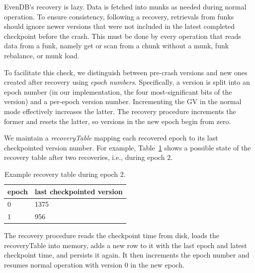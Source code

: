\documentclass[sigplan,10pt]{acmart}
\newcommand{\remove}[1]{}
\newcommand{\sys}{EvenDB}
\begin{document}
\sys's recovery is lazy. 
Data is fetched into munks as needed during normal operation. 
To ensure consistency, following a recovery,  
retrievals from funks should ignore newer versions that were not included in the latest completed checkpoint before the crash. 
This must be done by every operation that reads data from a funk, namely get or scan from a chunk without a munk, 
funk rebalance, or munk load. 

To facilitate this check, we distinguish between pre-crash versions and new ones created after recovery using \emph{epoch numbers}. 
Specifically, a version is split into an epoch number (in our implementation, the four most-significant bits of the version) and a per-epoch version number. 
Incrementing the GV in the normal mode effectively increases the latter.
The recovery procedure increments the former and resets the latter, so 
versions in the new epoch begin from zero. 

We maintain a \emph{recoveryTable} mapping each recovered epoch to its last checkpointed version number. 
For example, Table~\ref{table:recovery} shows a possible state of the recovery table after two recoveries, i.e., during epoch $2$. 

\begin{table}
\begin{center}
\begin{tabular}{ll}
epoch & last checkpointed version \\
\hline
0 & 1375\\
1 &  956\\
\end{tabular}
\end{center}
\caption{Example recovery table during epoch $2$.}
\label{table:recovery}
\end{table} 

 \remove{
Every read from a funk  %
refers to the recovery table in order to identify versions that should be ignored -- 
these are versions from old epochs that exceed the checkpoint number for their epoch. 
}
The recovery procedure reads the checkpoint time from disk, loads the recoveryTable into memory, adds a new row to it with the last epoch and latest checkpoint time, and persists it again. It then increments the epoch number and resumes normal operation with version  $0$ in the new epoch.
\end{document}
